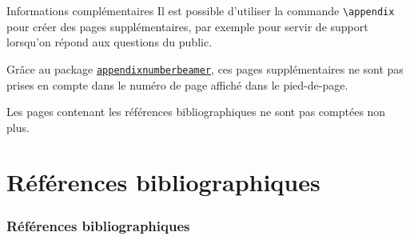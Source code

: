 \documentclass[10pt,    %
    french,             %
    xcolor=table,       %
    envcountsect        %
]{beamer}
\begin{document}
\begin{frame}{Informations complémentaires}
	Il est possible d'utiliser la commande \texttt{\textbackslash{}appendix} pour créer des pages supplémentaires, par exemple pour servir de support lorsqu'on répond aux questions du public. 
	
    \vspace{0.25cm}
	Grâce au package \href{https://ctan.org/pkg/appendixnumberbeamer?lang=en}{\texttt{appendixnumberbeamer}}, ces pages supplémentaires ne sont pas prises en compte dans le numéro de page affiché dans le pied-de-page.
	
    \vspace{0.25cm}
	Les pages contenant les références bibliographiques ne sont pas comptées non plus.
\end{frame}

\section{Références bibliographiques}
\label{sec:biblio}
\sectionframe

\begin{frame}[t,allowframebreaks]
    \frametitle{Références bibliographiques}
    
    \printbibliography
\end{frame}



\end{document}
